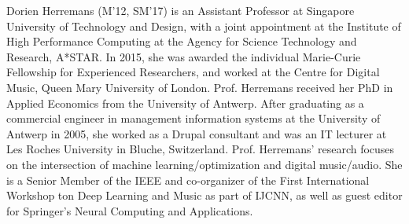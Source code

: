 \documentclass{ieeeaccess}
\begin{document}
\begin{IEEEbiography}{Dorien Herremans} (M'12, SM'17) is an Assistant Professor at Singapore University of Technology and Design, with a joint appointment at the Institute of High Performance Computing at the Agency for Science Technology and Research, A*STAR. In 2015, she was awarded the individual Marie-Curie Fellowship for Experienced Researchers, and worked at the Centre for Digital Music, Queen Mary University of London. Prof. Herremans received her PhD in Applied Economics from the University of Antwerp. After graduating as a commercial engineer in management information systems at the University of Antwerp in 2005, she worked as a Drupal consultant and was an IT lecturer at Les Roches University in Bluche, Switzerland. Prof. Herremans' research focuses on the intersection of machine learning/optimization and digital music/audio. She is a Senior Member of the IEEE and co-organizer of the First International
Workshop ton Deep Learning and Music as part of IJCNN, as well as guest editor for Springer's Neural Computing and Applications.
\end{IEEEbiography}
\vfill\null
\EOD
\end{document}
